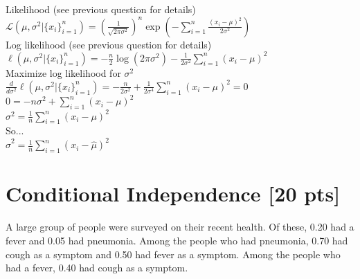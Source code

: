 \documentclass[11pt]{article}
\begin{document}
\begin{enumerate}
\begin{answertext}{9cm}{}
Likelihood (see previous question for details)\\
$\mathcal{L}(\mu, \sigma^2 | \{x_i\}_{i=1}^{n}) = (\frac{1}{\sqrt{2\pi\sigma^2}})^n \exp(-\sum_{i=1}^{n}\frac{(x_i-\mu)^2}{2\sigma^2})$\\

Log likelihood (see previous question for details)\\
$\ell(\mu, \sigma^2 | \{x_i\}_{i=1}^{n}) = -\frac{n}{2}\log(2\pi\sigma^2) - \frac{1}{2\sigma^2}\sum_{i=1}^{n}(x_i-\mu)^2$\\

Maximize log likelihood for $\sigma^2$\\
$\frac{d}{d\sigma^2}\ell(\mu, \sigma^2 | \{x_i\}_{i=1}^{n}) = -\frac{n}{2\sigma^2}+\frac{1}{2\sigma^4}\sum_{i=1}^{n}(x_i-\mu)^2 = 0$\\
$0 = -n\sigma^2+\sum_{i=1}^{n}(x_i-\mu)^2$\\
$\sigma^2 = \frac{1}{n}\sum_{i=1}^{n}(x_i-\mu)^2$\\

So...\\
$\hat{\sigma}^2 = \frac{1}{n}\sum_{i=1}^{n}(x_i-\hat{\mu})^2$

\end{answertext}

\end{enumerate}

\pagebreak
\section{Conditional Independence [20 pts]}
A large group of people were surveyed on their recent health. Of these, 0.20 had a fever and 0.05 had pneumonia. Among the people who had pneumonia, 0.70 had cough as a symptom and 0.50 had fever as a symptom. Among the people who had a fever, 0.40 had cough as a symptom.
\end{document}
